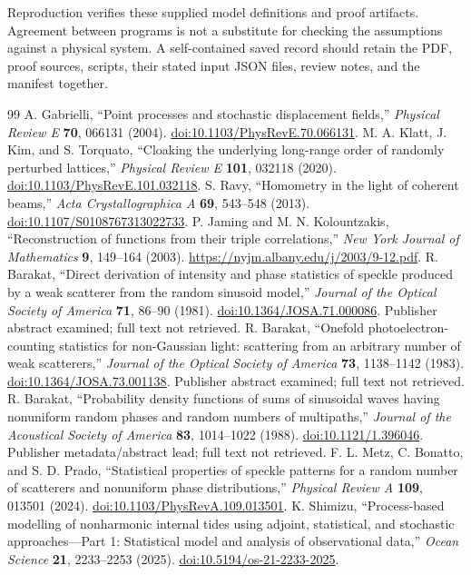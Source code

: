 \documentclass[11pt]{article}
\begin{document}
Reproduction verifies these supplied model definitions and proof artifacts.
Agreement between programs is not a substitute for checking the assumptions
against a physical system. A self-contained saved record should retain the
PDF, proof sources, scripts, their stated input JSON files, review notes,
and the manifest together.

\begin{thebibliography}{99}
 A. Gabrielli, ``Point processes and stochastic
displacement fields,'' \emph{Physical Review E} \textbf{70}, 066131 (2004).
\href{https://doi.org/10.1103/PhysRevE.70.066131}{doi:10.1103/PhysRevE.70.066131}.
 M. A. Klatt, J. Kim, and S. Torquato, ``Cloaking the
underlying long-range order of randomly perturbed lattices,''
\emph{Physical Review E} \textbf{101}, 032118 (2020).
\href{https://doi.org/10.1103/PhysRevE.101.032118}{doi:10.1103/PhysRevE.101.032118}.
 S. Ravy, ``Homometry in the light of coherent beams,''
\emph{Acta Crystallographica A} \textbf{69}, 543--548 (2013).
\href{https://doi.org/10.1107/S0108767313022733}{doi:10.1107/S0108767313022733}.
 P. Jaming and M. N. Kolountzakis, ``Reconstruction of
functions from their triple correlations,'' \emph{New York Journal of
Mathematics} \textbf{9}, 149--164 (2003).
\url{https://nyjm.albany.edu/j/2003/9-12.pdf}.
 R. Barakat, ``Direct derivation of intensity and phase
statistics of speckle produced by a weak scatterer from the random sinusoid
model,'' \emph{Journal of the Optical Society of America} \textbf{71},
86--90 (1981).
\href{https://doi.org/10.1364/JOSA.71.000086}{doi:10.1364/JOSA.71.000086}.
Publisher abstract examined; full text not retrieved.
 R. Barakat, ``Onefold photoelectron-counting statistics
for non-Gaussian light: scattering from an arbitrary number of weak
scatterers,'' \emph{Journal of the Optical Society of America} \textbf{73},
1138--1142 (1983).
\href{https://doi.org/10.1364/JOSA.73.001138}{doi:10.1364/JOSA.73.001138}.
Publisher abstract examined; full text not retrieved.
 R. Barakat, ``Probability density functions of sums of
sinusoidal waves having nonuniform random phases and random numbers of
multipaths,'' \emph{Journal of the Acoustical Society of America}
\textbf{83}, 1014--1022 (1988).
\href{https://doi.org/10.1121/1.396046}{doi:10.1121/1.396046}.
Publisher metadata/abstract lead; full text not retrieved.
 F. L. Metz, C. Bonatto, and S. D. Prado, ``Statistical
properties of speckle patterns for a random number of scatterers and
nonuniform phase distributions,'' \emph{Physical Review A} \textbf{109},
013501 (2024).
\href{https://doi.org/10.1103/PhysRevA.109.013501}{doi:10.1103/PhysRevA.109.013501}.
 K. Shimizu, ``Process-based modelling of nonharmonic
internal tides using adjoint, statistical, and stochastic approaches---Part 1:
Statistical model and analysis of observational data,'' \emph{Ocean Science}
\textbf{21}, 2233--2253 (2025).
\href{https://doi.org/10.5194/os-21-2233-2025}{doi:10.5194/os-21-2233-2025}.
\end{thebibliography}
\end{document}
